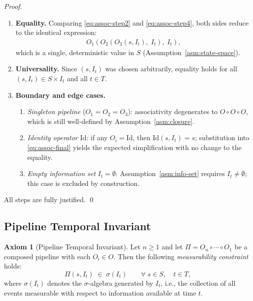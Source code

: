 \documentclass[12pt,openany]{book}
\newcommand{\calI}{\mathcal{I}}
\numberwithin{equation}{chapter}
\theoremstyle{plain}
\theoremstyle{definition}
\newtheorem{axiom}[theorem]{Axiom}
\theoremstyle{remark}
\numberwithin{equation}{chapter}
\theoremstyle{plain}
\newcommand{\calO}{\mathcal{O}}
\newcommand{\calS}{\mathcal{S}}
\newcommand{\calT}{\mathcal{T}}
\def\calI{I}%
\def\calS{S}%
\def\calT{T}%
\def\calO{O}%
\begin{document}
\begin{proof}
\begin{enumerate}
  \item \textbf{Equality.}
        Comparing \eqref{eq:assoc-step2} and \eqref{eq:assoc-step4},
        both sides reduce to the identical expression:
        \begin{align}
          O_1\!\left(
            O_2\!\left(O_3(s, \calI_t),\; \calI_t\right),\;
            \calI_t
          \right),
          \label{eq:assoc-final}
        \end{align}
        which is a single, deterministic value in $\calS$
        (Assumption~\ref{asm:state-space}).

  \item \textbf{Universality.}
        Since $(s, \calI_t)$ was chosen arbitrarily, equality
        holds for all $(s, \calI_t) \in \calS \times \calI_t$ and
        all $t \in \calT$.

  \item \textbf{Boundary and edge cases.}
        \begin{enumerate}
          \item \emph{Singleton pipeline} ($O_1 = O_2 = O_3$):
                associativity degenerates to $O \circ O \circ O$,
                which is still well-defined by
                Assumption~\ref{asm:closure}.
          \item \emph{Identity operator} $\mathrm{Id}$:
                if any $O_i = \mathrm{Id}$, then
                $\mathrm{Id}(s, \calI_t) = s$; substitution into
                \eqref{eq:assoc-final} yields the expected
                simplification with no change to the equality.
          \item \emph{Empty information set} $\calI_t = \emptyset$:
                Assumption~\ref{asm:info-set} requires
                $\calI_t \neq \emptyset$; this case is excluded by
                construction.
        \end{enumerate}
\end{enumerate}

\noindent
All steps are fully justified.
\hfill\qed
\end{proof}

\subsection{Pipeline Temporal Invariant}
\label{subsec:pipeline}

\begin{axiom}[Pipeline Temporal Invariant]
\label{ax:pipeline}
Let $n \geq 1$ and let $\Pi = O_n \circ \cdots \circ O_1$ be a
composed pipeline with each $O_i \in \calO$.  Then the following
\emph{measurability constraint} holds:
\begin{equation}
  \Pi(s, \calI_t) \;\in\; \sigma(\calI_t)
  \qquad
  \forall\; s \in \calS,\quad t \in \calT,
  \label{eq:pipeline-invariant}
\end{equation}
where $\sigma(\calI_t)$ denotes the $\sigma$-algebra generated by
$\calI_t$, i.e., the collection of all events measurable with respect
to information available at time $t$.
\end{axiom}
\end{document}
